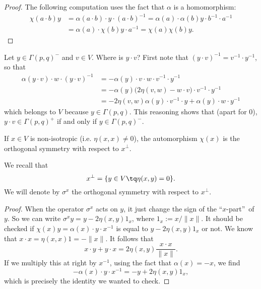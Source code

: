 \begin{proof}
	The following computation uses the fact that $\alpha$ is a homomorphism:
	\[
		\begin{split}
			\chi(a\cdot b)y & =\alpha(a\cdot b)\cdot y\cdot (a\cdot b)^{-1}
			=\alpha(a)\cdot\alpha(b)y\cdot b^{-1}\cdot a^{-1}               \\
			                & =\alpha(a)\cdot\chi(b)y\cdot a^{-1}
			=\chi(a)\chi(b)y.
		\end{split}
	\]
\end{proof}
Let $y\in\Gamma(p,q)^-$ and $v\in V$. Where is $y\cdot v$? First note that $(y\cdot v)^{-1}=v^{-1}\cdot y^{-1}$, so that
\begin{equation}
	\begin{split}
		\alpha(y\cdot v)\cdot w\cdot(y\cdot v)^{-1} & =-\alpha(y)\cdot v\cdot w\cdot v^{-1}\cdot y^{-1}                     \\
		                                            & =-\alpha(y)\big( 2\eta(v,w)-w\cdot v \big)\cdot v^{-1}\cdot y^{-1}    \\
		                                            & =-2\eta(v,w)\alpha(y)\cdot v^{-1}\cdot y+\alpha(y)\cdot w\cdot y^{-1}
	\end{split}
\end{equation}
which belongs to $V$ because $y\in\Gamma(p,q)$. This reasoning shows that (apart for $0$), $y\cdot v\in\Gamma(p,q)^+$ if and only if $y\in\Gamma(p,q)^-$.

\begin{lemma}
	If $x\in V$ is non-isotropic (i.e. $\eta(x,x)\neq 0$), the automorphism $\chi(x)$  is the orthogonal symmetry with respect to $x^{\perp}$.
\end{lemma}

We recall that
\[
	x^{\perp}=\{ y\in V\tq\eta(x,y)=0  \}.
\]
We will denote by $\sigma^x$ the orthogonal symmetry with respect to $x^{\perp}$.

\begin{proof}
	When the operator $\sigma^x$ acts on $y$, it just change the sign of the ``$x$-part''\ of $y$. So we can write $\sigma^x y=y-2\eta(x,y) 1_x$, where $1_x:=x/\|x\|$. It should be checked if
	$\chi(x)y=\alpha(x)\cdot y\cdot x^{-1}$ is equal to $y-2\eta(x,y) 1_x$ or not. We know that $x\cdot x=\eta(x,x)1=-\|x\|$. It follows that
	\[
		x\cdot y+y\cdot x=2\eta(x,y)\frac{x\cdot x}{\|x\|}.
	\]
	If we multiply this at right by $x^{-1}$, using the fact that $\alpha(x)=-x$, we find
	\[
		-\alpha(x)\cdot y\cdot x^{-1}=-y+2\eta(x,y) 1_x,
	\]
	which is precisely the identity we wanted to check.
\end{proof}

